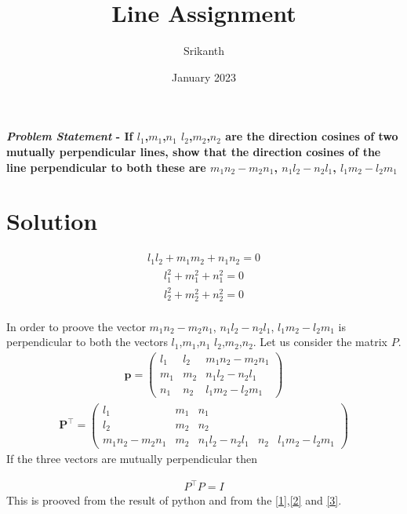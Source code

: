 \documentclass[12pt]{article}
\title{\textbf{Line Assignment}}
\author{Srikanth}
\date{January 2023}
\let\vec\mathbf
\begin{document}
\maketitle
\paragraph{\textit{Problem Statement} - If $l_1$,$m_1$,$n_1$  $l_2$,$m_2$,$n_2$ are the direction cosines of two mutually perpendicular lines, show that the direction cosines of the line perpendicular to both these are  $m_1n_2-m_2n_1$, $n_1l_2-n_2l_1$, $l_1m_2-l_2m_1$}
\section*{Solution}
\begin{align}
 l_1l_2+m_1m_2+n_1n_2=0\label{1}
 \end{align}
 \begin{align}
 l_1^2+m_1^2+n_1^2=0\label{2}
  \end{align}
  \begin{align}
  l_2^2+m_2^2+n_2^2=0\label{3}
  \end{align}
\\
In order to proove the vector  $m_1n_2-m_2n_1$, $n_1l_2-n_2l_1$, $l_1m_2-l_2m_1$ is perpendicular to both the vectors $l_1$,$m_1$,$n_1$  $l_2$,$m_2$,$n_2$. Let us consider the matrix $P$.
\\
\begin{align}
\vec{p}=
	\begin{pmatrix}
l_1&l_2&m_1n_2-m_2n_1\\
        m_1&m_2&n_1l_2-n_2l_1\\
        n_1&n_2&l_1m_2-l_2m_1
	\end{pmatrix}
	\end{align}
	\begin{align}	
	\vec{P}^{\top} =
\begin{pmatrix}
l_1&m_1&n_1\\
l_2&m_2&n_2\\
m_1n_2-m_2n_1&m_2&n_1l_2-n_2l_1&n_2&l_1m_2-l_2m_1
\end{pmatrix}	
	\end{align}
	If the three vectors are mutually perpendicular then
	
	\begin{align}
	P^{\top} P=I
	\end{align}
	This is prooved from the result of python and from the \eqref{1},\eqref{2} and \eqref{3}.	
	
\end{document}
